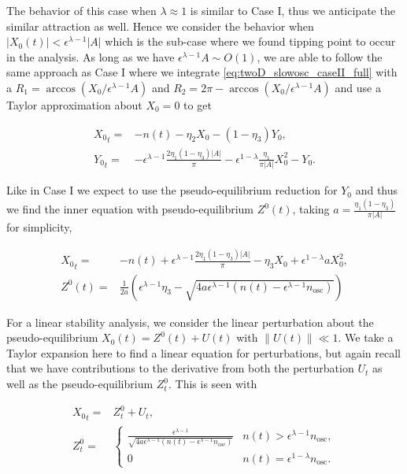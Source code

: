 The behavior of this case when $\lambda\approx 1$ is similar to Case I, thus we anticipate the similar attraction as well. Hence we consider the behavior when $|X_0(t)|<\epsilon^{\lambda-1}|A|$ which is the sub-case where we found tipping point to occur in the analysis. As long as we have $\epsilon^{\lambda-1}A\sim O(1)$, we are able to follow the same approach as Case I where we integrate \eqref{eq:twoD_slowosc_caseII_full} with a $R_1=\arccos(X_0/\epsilon^{\lambda-1}A)$ and $R_2=2\pi-\arccos(X_0/\epsilon^{\lambda-1}A)$ and use a Taylor approximation about $X_0=0$ to get

\begin{equation*}
\begin{aligned}
{X_0}_t =& - n(t)-\eta_2 X_0 -(1-\eta_3)Y_0,\\
{Y_0}_t =& -\epsilon^{\lambda-1}\frac{2\eta_1(1-\eta_3)|A|}{\pi}-\epsilon^{1-\lambda}\frac{\eta_1}{\pi|A|}X_0^2- Y_0.
\end{aligned}
\end{equation*}

Like in Case I we expect to use the pseudo-equilibrium reduction for $Y_0$ and thus we find the inner equation with pseudo-equilibrium $Z^0(t)$, taking $a=\frac{\eta_1(1-\eta_3)}{\pi|A|}$ for simplicity,

\begin{equation*}
\begin{aligned}
{X_0}_t =& -n(t)+\epsilon^{\lambda-1}\frac{2\eta_1(1-\eta_3)|A|}{\pi}-\eta_3 X_0+\epsilon^{1-\lambda}aX_0^2,\\
Z^0(t) =& \frac{1}{2a}\left(\epsilon^{\lambda-1}\eta_3-\sqrt{4a\epsilon^{\lambda-1}(n(t)-\epsilon^{\lambda-1}n_{\text{osc}})}\right)
\end{aligned}
\end{equation*}

For a linear stability analysis, we consider the linear perturbation about the pseudo-equilibrium $X_0(t)= Z^0(t)+U(t)$ with $\lVert U(t)\rVert \ll 1$. We take a Taylor expansion here to find a linear equation for perturbations, but again recall that we have contributions to the derivative from both the perturbation $U_t$ as well as the pseudo-equilibrium $Z^0_t$. This is seen with

\begin{equation}
\begin{aligned}
{X_0}_t =& Z^0_t+U_t,\\
Z^0_t=&\begin{cases}
\frac{\epsilon^{\lambda-1}}{\sqrt{4a\epsilon^{\lambda-1}(n(t)-\epsilon^{\lambda-1}n_{\text{osc}})}} & n(t)>\epsilon^{\lambda-1}n_{\text{osc}},\\
0 & n(t)=\epsilon^{1-\lambda}n_{\text{osc}}.
\end{cases}
\end{aligned}
\end{equation}

